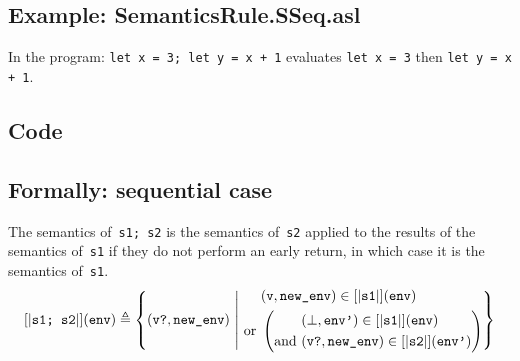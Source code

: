 \documentclass{book}
\begin{document}
  \subsection{Example: SemanticsRule.SSeq.asl}
  In the program:
  \texttt{let x = 3; let y = x + 1} evaluates \texttt{let x = 3} then \texttt{let y = x + 1}.

  \subsection{Code}

\begin{formal}
  \subsection{Formally: sequential case}
  The semantics of~\texttt{s1; s2} is the semantics of~\texttt{s2} applied to the results
  of the semantics of~\texttt{s1} if they do not perform an early return, in which
  case it is the semantics of~\texttt{s1}.
  \begin{align}
    \left[| \texttt{s1; s2} \right|] (\texttt{env}) \triangleq
      \left\{ (\texttt{v?}, \texttt{new\_env}) \ \middle|\ {}
      \begin{aligned}
        & (\texttt{v}, \texttt{new\_env}) \in \left[| \texttt{s1} \right|] (\texttt{env})
        \\ \text{or}\ &
        \left(
        \begin{aligned}
            & (\bot{}, \texttt{env'}) \in \left[| \texttt{s1} \right|] (\texttt{env})
            \\ \text{and}\ &
            (\texttt{v?}, \texttt{new\_env}) \in \left[| \texttt{s2} \right|] (\texttt{env'})
        \end{aligned}
        \right)
      \end{aligned}
      \right\}
    \label{eq:sem-seq-sseq}
  \end{align}


\end{formal}
\end{document}
